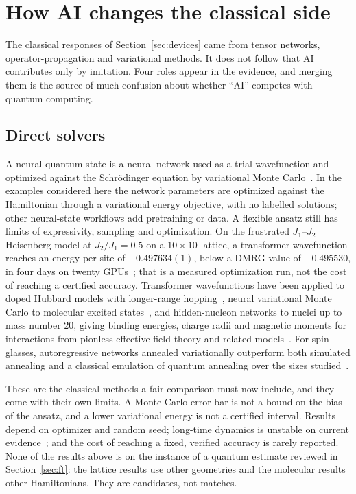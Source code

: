 \section{How AI changes the classical side}
\label{sec:ai}

The classical responses of Section~\ref{sec:devices} came from tensor networks, operator-propagation and variational methods. It does not follow that AI contributes only by imitation. Four roles appear in the evidence, and merging them is the source of much confusion about whether ``AI'' competes with quantum computing.

\subsection{Direct solvers}
A neural quantum state is a neural network used as a trial wavefunction and optimized against the Schr\"odinger equation by variational Monte Carlo~\cite{carleo2017,carleo2019}. In the examples considered here the network parameters are optimized against the Hamiltonian through a variational energy objective, with no labelled solutions; other neural-state workflows add pretraining or data. A flexible ansatz still has limits of expressivity, sampling and optimization. On the frustrated $J_1$--$J_2$ Heisenberg model at $J_2/J_1=0.5$ on a $10\times10$ lattice, a transformer wavefunction reaches an energy per site of $-0.497634(1)$, below a DMRG value of $-0.495530$, in four days on twenty GPUs~\cite{rende2024}; that is a measured optimization run, not the cost of reaching a certified accuracy. Transformer wavefunctions have been applied to doped Hubbard models with longer-range hopping~\cite{gu2026}, neural variational Monte Carlo to molecular excited states~\cite{pfau2024,schatzle2026}, and hidden-nucleon networks to nuclei up to mass number 20, giving binding energies, charge radii and magnetic moments for interactions from pionless effective field theory and related models~\cite{lovato2022,gnech2024,lovato2026}. For spin glasses, autoregressive networks annealed variationally outperform both simulated annealing and a classical emulation of quantum annealing over the sizes studied~\cite{hibat2021,hibat2021b}.

These are the classical methods a fair comparison must now include, and they come with their own limits. A Monte Carlo error bar is not a bound on the bias of the ansatz, and a lower variational energy is not a certified interval. Results depend on optimizer and random seed; long-time dynamics is unstable on current evidence~\cite{tindall2025}; and the cost of reaching a fixed, verified accuracy is rarely reported. None of the results above is on the instance of a quantum estimate reviewed in Section~\ref{sec:ft}: the lattice results use other geometries and the molecular results other Hamiltonians. They are candidates, not matches.

